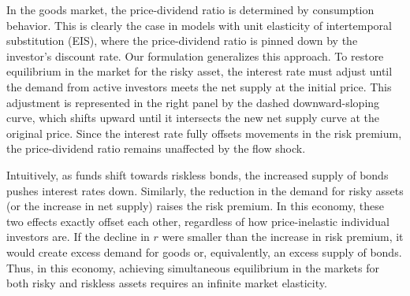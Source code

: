 In the goods market, the price-dividend ratio is determined by consumption behavior. This is clearly the case in models with unit elasticity of intertemporal substitution (EIS), where the price-dividend ratio is pinned down by the investor’s discount rate. Our formulation generalizes this approach.
To restore equilibrium in the market for the risky asset, the interest rate must adjust until the demand from active investors meets the net supply at the initial price. This adjustment is represented in the right panel by the dashed downward-sloping curve, which shifts upward until it intersects the new net supply curve at the original price. Since the interest rate fully offsets movements in the risk premium, the price-dividend ratio remains unaffected by the flow shock.

Intuitively, as funds shift towards riskless bonds, the increased supply of bonds pushes interest rates down. 
Similarly, the reduction in the demand for risky assets (or the increase in net supply) raises the risk premium. 
In this economy, these two effects exactly offset each other, regardless of how price-inelastic individual investors are. 
If the decline in $r$ were smaller than the increase in risk premium, it would create excess demand for goods or, equivalently, an excess supply of bonds. 
Thus, in this economy, achieving simultaneous equilibrium in the markets for both risky and riskless assets requires an infinite market elasticity.


